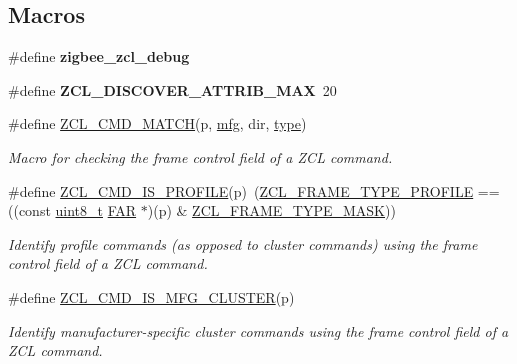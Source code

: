 \subsection*{Macros}
\begin{DoxyCompactItemize}
\item 
\mbox{\label{group__zcl_ga1d1ebe413ff0242049bed47dc8ffefe9}} 
\#define {\bfseries zigbee\+\_\+zcl\+\_\+debug}
\item 
\mbox{\label{group__zcl_ga0b1185c5098f4fa736010b594ab2b71f}} 
\#define {\bfseries Z\+C\+L\+\_\+\+D\+I\+S\+C\+O\+V\+E\+R\+\_\+\+A\+T\+T\+R\+I\+B\+\_\+\+M\+AX}~20
\item 
\#define \hyperlink{group__zcl_ga0bbd651dae138e104715e6e2de62084e}{Z\+C\+L\+\_\+\+C\+M\+D\+\_\+\+M\+A\+T\+CH}(p,  \hyperlink{group__zcl_gacef7f7e36d411b8000d1ac172c5e8782}{mfg},  dir,  \hyperlink{group__zcl_ga1d127017fb298b889f4ba24752d08b8e}{type})
\begin{DoxyCompactList}\small\item\em Macro for checking the frame control field of a Z\+CL command. \end{DoxyCompactList}\item 
\#define \hyperlink{group__zcl_gaafcfd290eea997dae1be3d22aa106264}{Z\+C\+L\+\_\+\+C\+M\+D\+\_\+\+I\+S\+\_\+\+P\+R\+O\+F\+I\+LE}(p)~(\hyperlink{group__zcl_ga332a452ea08eb67a3ebf962320bf8819}{Z\+C\+L\+\_\+\+F\+R\+A\+M\+E\+\_\+\+T\+Y\+P\+E\+\_\+\+P\+R\+O\+F\+I\+LE} == ((const \hyperlink{group__hal__dos_gae1affc9ca37cfb624959c866a73f83c2}{uint8\+\_\+t} \hyperlink{group__hal_gaef060b3456fdcc093a7210a762d5f2ed}{F\+AR} $\ast$)(p) \& \hyperlink{group__zcl_gad2e6a61d29cd303e906699a49fa2eb8e}{Z\+C\+L\+\_\+\+F\+R\+A\+M\+E\+\_\+\+T\+Y\+P\+E\+\_\+\+M\+A\+SK}))
\begin{DoxyCompactList}\small\item\em Identify profile commands (as opposed to cluster commands) using the frame control field of a Z\+CL command. \end{DoxyCompactList}\item 
\#define \hyperlink{group__zcl_gaaef303ea4f7fa9a8beeace9ce3a1f9fd}{Z\+C\+L\+\_\+\+C\+M\+D\+\_\+\+I\+S\+\_\+\+M\+F\+G\+\_\+\+C\+L\+U\+S\+T\+ER}(p)
\begin{DoxyCompactList}\small\item\em Identify manufacturer-\/specific cluster commands using the frame control field of a Z\+CL command. \end{DoxyCompactList}\item 

\end{DoxyCompactItemize}
